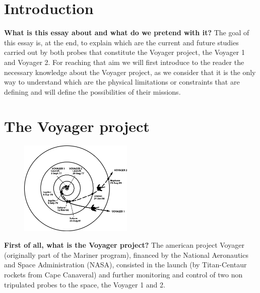 \documentclass[11pt,a4paper]{article}
\begin{document}

\clearpage
\tableofcontents
\clearpage

\section{Introduction}
\textbf{What is this essay about and what do we pretend with it?}
The goal of this essay is, at the end, to explain which are the current and future studies carried out by both probes that constitute the Voyager project, the Voyager 1 and Voyager 2. For reaching that aim we will first introduce to the reader the necessary knowledge about the Voyager project, as we consider that it is the only way to understand which are the physical limitations or constraints that are defining and will define the possibilities of their missions.

\section{The Voyager project}
\begin{figure}
  \begin{center}
  \vspace{-20pt} \includegraphics[width=0.48\textwidth]{./voyagerpath}
  \end{center}
  \vspace{-5pt}
  \caption{}
  \vspace{-10pt}
\end{figure}
\textbf{First of all, what is the Voyager project?}
The american project Voyager (originally part of the Mariner program), financed by the National Aeronautics and Space Administration (NASA), consisted in the launch (by Titan-Centaur rockets from Cape Canaveral) and further monitoring and control of two non tripulated probes to the space, the Voyager 1 and 2.
\\\\
\end{document}
